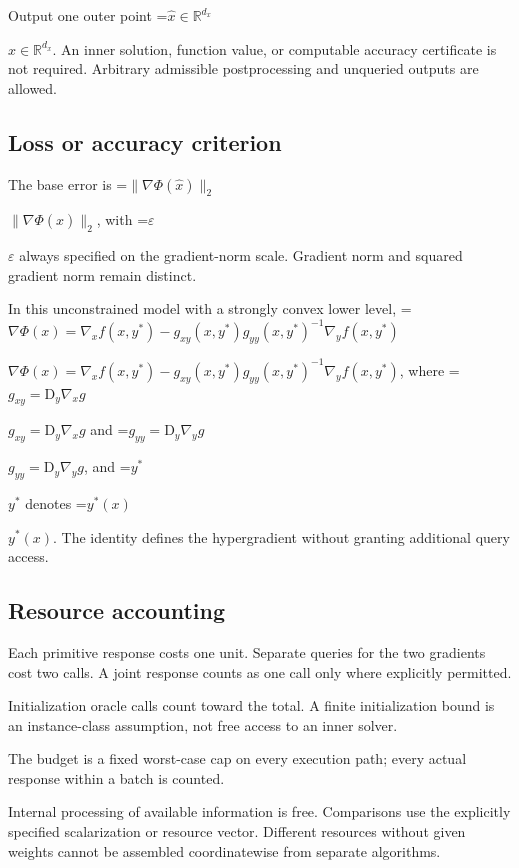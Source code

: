\documentclass[10pt,a4paper]{article}
\newcommand{\AtlasMath}[1]{\par\begingroup\centering\setbox0=\hbox{$\displaystyle #1$}\ifdim\wd0>1.4\linewidth\typeout{ATLAS WIDE FORMULA: \the\wd0}\fi\ifdim\wd0>\linewidth\resizebox{\linewidth}{!}{\box0}\else\box0\fi\par\endgroup}
\newcommand{\AtlasInlineMath}[1]{\begingroup\setbox0=\hbox{$#1$}\ifdim\wd0>.4\linewidth\endgroup\AtlasMath{#1}\else\endgroup$#1$\fi}
\begin{document}
Output one outer point \AtlasInlineMath{\widehat{x}\in\mathbb{R}^{d_x}}. An inner solution, function value, or computable accuracy certificate is not required. Arbitrary admissible postprocessing and unqueried outputs are allowed.



\subsection{Loss or accuracy criterion}


The base error is \AtlasInlineMath{\|\nabla\Phi(\widehat{x})\|_2}, with \AtlasInlineMath{\varepsilon} always specified on the gradient-norm scale. Gradient norm and squared gradient norm remain distinct.



In this unconstrained model with a strongly convex lower level, \AtlasInlineMath{\nabla\Phi(x)=\nabla_x f(x,y^*)-g_{xy}(x,y^*)g_{yy}(x,y^*)^{-1}\nabla_y f(x,y^*)}, where \AtlasInlineMath{g_{xy}=\mathrm{D}_y\nabla_x g} and \AtlasInlineMath{g_{yy}=\mathrm{D}_y\nabla_y g}, and \AtlasInlineMath{y^*} denotes \AtlasInlineMath{y^*(x)}. The identity defines the hypergradient without granting additional query access.



\subsection{Resource accounting}


Each primitive response costs one unit. Separate queries for the two gradients cost two calls. A joint response counts as one call only where explicitly permitted.



Initialization oracle calls count toward the total. A finite initialization bound is an instance-class assumption, not free access to an inner solver.



The budget is a fixed worst-case cap on every execution path; every actual response within a batch is counted.



Internal processing of available information is free. Comparisons use the explicitly specified scalarization or resource vector. Different resources without given weights cannot be assembled coordinatewise from separate algorithms.
\end{document}

